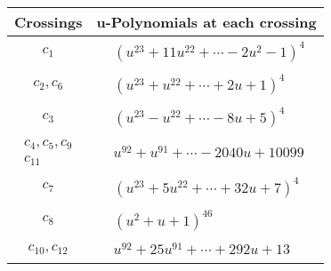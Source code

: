 \documentclass[1p]{elsarticle_modified}
\theoremstyle{definition}
\begin{document}
\begin{tabular}{m{50pt}|m{274pt}}
Crossings & \hspace{64pt}u-Polynomials at each crossing \\
\hline $$\begin{aligned}c_{1}\end{aligned}$$&$\begin{aligned}
&(u^{23}+11 u^{22}+\cdots-2 u^2-1)^{4}
\end{aligned}$\\
\hline $$\begin{aligned}c_{2},c_{6}\end{aligned}$$&$\begin{aligned}
&(u^{23}+u^{22}+\cdots+2 u+1)^{4}
\end{aligned}$\\
\hline $$\begin{aligned}c_{3}\end{aligned}$$&$\begin{aligned}
&(u^{23}- u^{22}+\cdots-8 u+5)^{4}
\end{aligned}$\\
\hline $$\begin{aligned}c_{4},c_{5},c_{9}\\c_{11}\end{aligned}$$&$\begin{aligned}
&u^{92}+u^{91}+\cdots-2040 u+10099
\end{aligned}$\\
\hline $$\begin{aligned}c_{7}\end{aligned}$$&$\begin{aligned}
&(u^{23}+5 u^{22}+\cdots+32 u+7)^{4}
\end{aligned}$\\
\hline $$\begin{aligned}c_{8}\end{aligned}$$&$\begin{aligned}
&(u^2+u+1)^{46}
\end{aligned}$\\
\hline $$\begin{aligned}c_{10},c_{12}\end{aligned}$$&$\begin{aligned}
&u^{92}+25 u^{91}+\cdots+292 u+13
\end{aligned}$\\
\hline
\end{tabular}\\~\\
\end{document}
